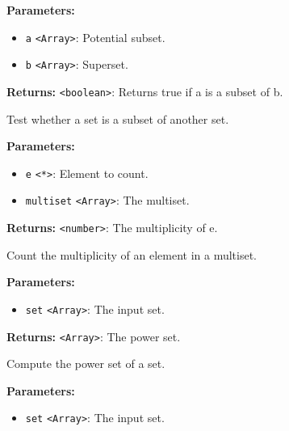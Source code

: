 \documentclass[12pt,a4paper]{article}
\begin{document}
\noindent \textbf{Parameters:}
\begin{itemize}
  \item \texttt{a} \texttt{<Array>}: Potential subset.
  \item \texttt{b} \texttt{<Array>}: Superset.
\end{itemize}

\noindent \textbf{Returns:} \texttt{<boolean>}: Returns true if a is a subset of b.

\noindent Test whether a set is a subset of another set.

\vspace{5mm}
\noindent {}


\noindent \textbf{Parameters:}
\begin{itemize}
  \item \texttt{e} \texttt{<*>}: Element to count.
  \item \texttt{multiset} \texttt{<Array>}: The multiset.
\end{itemize}

\noindent \textbf{Returns:} \texttt{<number>}: The multiplicity of e.

\noindent Count the multiplicity of an element in a multiset.

\vspace{5mm}
\noindent {}


\noindent \textbf{Parameters:}
\begin{itemize}
  \item \texttt{set} \texttt{<Array>}: The input set.
\end{itemize}

\noindent \textbf{Returns:} \texttt{<Array>}: The power set.

\noindent Compute the power set of a set.

\vspace{5mm}
\noindent {}


\noindent \textbf{Parameters:}
\begin{itemize}
  \item \texttt{set} \texttt{<Array>}: The input set.
\end{itemize}
\end{document}

